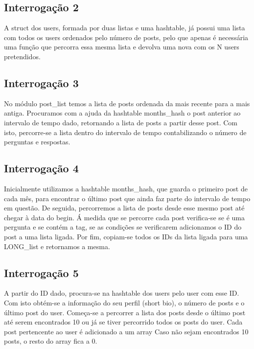 \documentclass[10pt]{article}
\begin{document}
\subsection{Interrogação 2}

	A struct dos users, formada por duas listas e uma hashtable, já possui uma lista com todos os users ordenados pelo número de posts, pelo que apenas é necessária uma função que percorra essa mesma lista e devolva uma nova com os N users pretendidos.

\subsection{Interrogação 3}

	No módulo post\_list temos a lista de posts ordenada da mais recente para a mais antiga.
	Procuramos com a ajuda da hashtable months\_hash o post anterior ao intervalo de tempo dado, retornando a lista de posts a partir desse post. Com isto, percorre-se a lista dentro do intervalo de tempo contabilizando o número de perguntas e respostas.

\subsection{Interrogação 4}

	Inicialmente utilizamos a hashtable months\_hash, que guarda o primeiro post de cada mês, para encontrar o último post que ainda faz parte do intervalo de tempo em questão. De seguida, percorremos a lista de posts desde esse mesmo post até chegar à data do begin. Á medida que se percorre cada post verifica-se se é uma pergunta e se contém a tag, se as condições se verificarem adicionamos o ID do post a uma lista ligada. Por fim, copiam-se todos os IDs da lista ligada para uma LONG\_list e retornamos a mesma.

\subsection{Interrogação 5}

	A partir do ID dado, procura-se na hashtable dos users pelo user com esse ID. Com isto obtém-se a informação do seu perfil (short bio), o número de posts e o último post do user.
	Começa-se a percorrer a lista dos posts desde o último post até serem encontrados 10 ou já se tiver percorrido todos os posts do user.
	Cada post pertencente ao user é adicionado a um array
	Caso não sejam encontrados 10 posts, o resto do array fica a 0.
\end{document}
